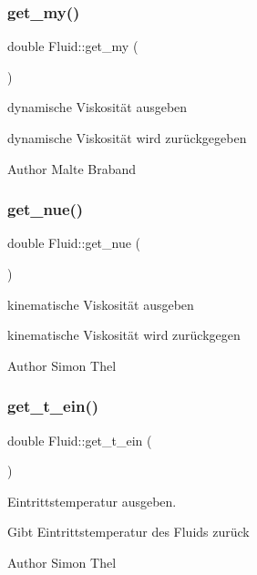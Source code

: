 \subsubsection{\texorpdfstring{get\+\_\+my()}{get\_my()}}
{\footnotesize\ttfamily double Fluid\+::get\+\_\+my (\begin{DoxyParamCaption}{ }\end{DoxyParamCaption})}



dynamische Viskosität ausgeben 

dynamische Viskosität wird zurückgegeben \begin{DoxyAuthor}{Author}
Malte Braband 
\end{DoxyAuthor}
\mbox{\label{class_fluid_ae0031c0e8f70a4fb3dacc34c9725c3c1}} 
\subsubsection{\texorpdfstring{get\+\_\+nue()}{get\_nue()}}
{\footnotesize\ttfamily double Fluid\+::get\+\_\+nue (\begin{DoxyParamCaption}{ }\end{DoxyParamCaption})}



kinematische Viskosität ausgeben 

kinematische Viskosität wird zurückgegen \begin{DoxyAuthor}{Author}
Simon Thel 
\end{DoxyAuthor}
\mbox{\label{class_fluid_a60d0c9269a8c8af00bf8828c7f764537}} 
\subsubsection{\texorpdfstring{get\+\_\+t\+\_\+ein()}{get\_t\_ein()}}
{\footnotesize\ttfamily double Fluid\+::get\+\_\+t\+\_\+ein (\begin{DoxyParamCaption}{ }\end{DoxyParamCaption})}



Eintrittstemperatur ausgeben. 

Gibt Eintrittstemperatur des Fluids zurück \begin{DoxyAuthor}{Author}
Simon Thel 
\end{DoxyAuthor}
\mbox{\label{class_fluid_af70884f77d5dd43499fcc70969100498}} 

